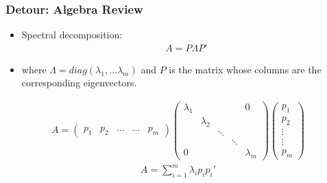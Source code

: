 \documentclass[
  shownotes,
  xcolor={svgnames},
  hyperref={colorlinks,citecolor=DarkBlue,linkcolor=DarkRed,urlcolor=DarkBlue}
  , aspectratio=169]{beamer}
\begin{document}
\begin{frame}
\frametitle{Detour: Algebra Review}
\begin{itemize}
\item Spectral decomposition: 
\medskip
\begin{align}
A = P\Lambda P'
\end{align}
 
\item where $\Lambda = diag(\lambda_1, \dots \lambda_m )$ and $P$ is the matrix whose columns are the corresponding eigenvectors.
\end{itemize}
\begin{align}
A=\left(\begin{array}{ccccc}
p_{1} & p_{2} & \dots & \dots & p_{m}\end{array}\right)\left(\begin{array}{ccccc}
\lambda_{1} &  &  &  & 0\\
 & \lambda_{2}\\
 &  & \ddots\\
 &  &  & \ddots\\
0 &  &  &  & \lambda_{m}
\end{array}\right)\left(\begin{array}{c}
p_{1}\\
p_{2}\\
\vdots\\
\vdots\\
p_{m}
\end{array}\right)
\end{align}
\begin{align}
A=\sum_{i=1}^{m}\lambda_{i}p_{i}p_{i}'
\end{align}

\end{frame}

\end{document}
